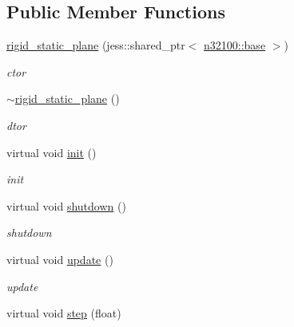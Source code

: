 \subsection*{Public Member Functions}
\begin{DoxyCompactItemize}
\item 
\hyperlink{classnebula_1_1content_1_1actor_1_1admin_1_1rigid__static__plane_a5b9619b49e19829a3b5a3d95023572d2}{rigid\_\-static\_\-plane} (jess::shared\_\-ptr$<$ \hyperlink{classnebula_1_1content_1_1scene_1_1admin_1_1base}{n32100::base} $>$)
\begin{DoxyCompactList}\small\item\em ctor \item\end{DoxyCompactList}\item 
\hyperlink{classnebula_1_1content_1_1actor_1_1admin_1_1rigid__static__plane_ab4861570d09eed728307ba6dc942e8ea}{$\sim$rigid\_\-static\_\-plane} ()
\begin{DoxyCompactList}\small\item\em dtor \item\end{DoxyCompactList}\item 
virtual void \hyperlink{classnebula_1_1content_1_1actor_1_1admin_1_1rigid__static__plane_a5334403f326a185523ef2c7c380ffa8f}{init} ()
\begin{DoxyCompactList}\small\item\em init \item\end{DoxyCompactList}\item 
virtual void \hyperlink{classnebula_1_1content_1_1actor_1_1admin_1_1rigid__static__plane_a40139ed218560b51d64612559be0564d}{shutdown} ()
\begin{DoxyCompactList}\small\item\em shutdown \item\end{DoxyCompactList}\item 
virtual void \hyperlink{classnebula_1_1content_1_1actor_1_1admin_1_1rigid__static__plane_ad14b9160b7c1aa9ae29d52141d1b6221}{update} ()
\begin{DoxyCompactList}\small\item\em update \item\end{DoxyCompactList}\item 
virtual void \hyperlink{classnebula_1_1content_1_1actor_1_1admin_1_1rigid__static__plane_af1c2da35d02592bf5cad8823775bb2d7}{step} (float)

\end{DoxyCompactItemize}
